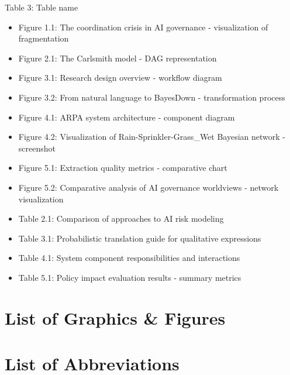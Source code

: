 \documentclass[
  11pt,
  letterpaper,
]{book}
\providecommand{\tightlist}{%
  \setlength{\itemsep}{0pt}\setlength{\parskip}{0pt}}
\begin{document}
Table 3: Table name

\begin{itemize}
\tightlist
\item
  Figure 1.1: The coordination crisis in AI governance - visualization
  of fragmentation\\
\item
  Figure 2.1: The Carlsmith model - DAG representation\\
\item
  Figure 3.1: Research design overview - workflow diagram\\
\item
  Figure 3.2: From natural language to BayesDown - transformation
  process\\
\item
  Figure 4.1: ARPA system architecture - component diagram\\
\item
  Figure 4.2: Visualization of Rain-Sprinkler-Grass\_Wet Bayesian
  network - screenshot\\
\item
  Figure 5.1: Extraction quality metrics - comparative chart\\
\item
  Figure 5.2: Comparative analysis of AI governance worldviews - network
  visualization\\
\item
  Table 2.1: Comparison of approaches to AI risk modeling\\
\item
  Table 3.1: Probabilistic translation guide for qualitative
  expressions\\
\item
  Table 4.1: System component responsibilities and interactions\\
\item
  Table 5.1: Policy impact evaluation results - summary metrics
\end{itemize}

\section*{List of Graphics \& Figures}\label{list-of-graphics-figures}


\section*{List of Abbreviations}\label{list-of-abbreviations}
\end{document}
